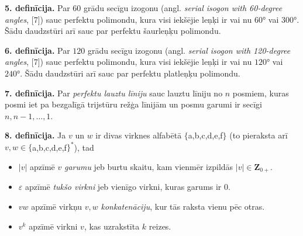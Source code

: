 \documentclass[utf8]{ludis2022}
\begin{document}

\vspace{10pt}

\noindent
{\bf{5. definīcija.}}
    Par $60$ grādu secīgu izogonu (angl. {\em serial isogon with 60-degree angles}, [7]) sauc perfektu polimondu, kura visi iekšējie leņķi ir vai nu $60°$ vai $300°$. Šādu daudzstūri arī sauc par perfektu šaurleņķu polimondu. 
\vspace{10pt}

\noindent
{\bf{6. definīcija.}}
     Par $120$ grādu secīgu izogonu (angl. {\em serial isogon with 120-degree angles}, [7]) sauc perfektu polimondu, kura visi iekšējie leņķi ir vai nu $120°$ vai $240°$. Šādu daudzstūri arī sauc par perfektu platleņķu polimondu. 





\vspace{10pt}

\noindent
{\bf{7. definīcija.}} 
Par {\em perfektu lauztu līniju} sauc lauztu līniju
no $n$ posmiem, kuras 
posmi iet pa bezgalīgā trijstūru režģa līnijām un 
posmu garumi ir secīgi $n, n-1, \ldots, 1$.

\vspace{10pt}

\noindent
{\bf{8. definīcija.}}
Ja $v$ un $w$ ir divas virknes alfabētā 
$\{$a,b,c,d,e,f$\}$ (to pieraksta arī 
$v,w \in \{$a,b,c,d,e,f$\}^{\ast}$), tad
\begin{itemize}
\item $|v|$ apzīmē $v$ {\em garumu} jeb burtu skaitu, 
kam vienmēr izpildās $|v| \in \mathbf{Z}_{0+}$.
\item $\varepsilon$ apzīmē {\em tukšo virkni} jeb 
vienīgo virkni, kuras garums ir $0$.
\item $vw$ apzīmē virkņu $v,w$ {\em konkatenāciju}, 
kur tās raksta vienu pēc otras. 
\item $v^k$ apzīmē virkni $v$, kas uzrakstīta $k$ reizes. 
\end{itemize}





\newpage
{}
\end{document}
